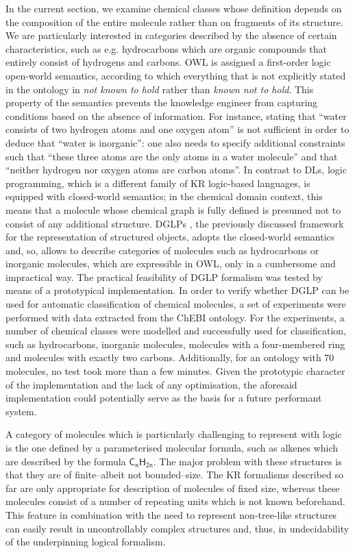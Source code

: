 \documentclass[10pt]{bmc_article}
\newenvironment{bmcformat}{\baselineskip20pt\sloppy\setboolean{publ}{false}}{\baselineskip20pt\sloppy}
\begin{document}
\begin{bmcformat}
In the current section, we examine chemical classes whose definition depends on the composition of the entire molecule rather than on fragments of its structure. We are particularly interested in categories described by the absence of certain characteristics, such as e.g. hydrocarbons which are organic compounds that entirely consist of hydrogens and carbons. OWL is assigned a first-order logic open-world semantics, according to which everything that is not explicitly stated in the ontology in \emph{not known to hold} rather than \emph{known not to hold}. This property of the semantics prevents the knowledge engineer from capturing conditions based on the absence of information. For instance, stating that ``water consists of two hydrogen atoms and one oxygen atom'' is not sufficient in order to deduce that ``water is inorganic'': one also needs to specify additional constraints such that ``these three atoms are the only atoms in a water molecule'' and that ``neither hydrogen nor oxygen atoms are carbon atoms''. In contrast to DLs, logic programming, which is a different family of KR logic-based languages, is equipped with closed-world semantics; in the chemical domain context, this means that a molecule whose chemical graph is fully defined is presumed not to consist of any additional structure. DGLPs \cite{magka2011}, the previously discussed framework for the representation of structured objects, adopts the closed-world semantics and, so, allows to describe categories of molecules such as hydrocarbons or inorganic molecules, which are expressible in  OWL, only in a cumbersome and impractical way. The practical feasibility of DGLP formalism was tested by means of a prototypical implementation. In order to verify whether DGLP can be used for automatic classification of chemical molecules, a set of experiments were performed with data extracted from the ChEBI ontology. For the experiments, a number of chemical classes were modelled and successfully used for classification, such as hydrocarbons, inorganic molecules, molecules with a four-membered ring and molecules with exactly two carbons. Additionally, for an ontology with 70 molecules, no test took more than a few minutes. Given the prototypic character of the implementation and the lack of any optimisation, the aforesaid implementation  could potentially serve as the basis for a future performant system. 


A category of molecules which is particularly challenging to represent with logic is the one defined by a parameterised molecular formula, such as alkenes which are described by the formula $\mathsf{C_nH_{2n}}$. The major problem with these structures is that they are of finite--albeit not bounded--size. The KR formalisms described so far are only appropriate for description of molecules of fixed size, whereas these molecules consist of a number of repeating units which is not known beforehand.  This feature in combination with the need to represent non-tree-like structures can easily result in uncontrollably complex structures and, thus, in undecidability of the underpinning logical formalism. 


\end{bmcformat}
\end{document}
